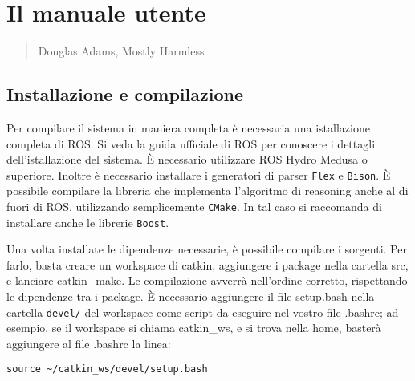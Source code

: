 \chapter{Il manuale utente}
\label{app:manuale}
\thispagestyle{empty}

\begin{quotation}
{\footnotesize
{}
\begin{flushright}
Douglas Adams, Mostly Harmless
\end{flushright}
}
\end{quotation}
\vspace{0.5cm}

\section{Installazione e compilazione}

Per compilare il sistema in maniera completa è necessaria una istallazione completa di ROS. Si veda la guida ufficiale di ROS per conoscere i dettagli dell'istallazione del sistema. \`E necessario utilizzare ROS Hydro Medusa o superiore.  %
Inoltre è necessario installare i generatori di parser \verb|Flex| e \verb|Bison|.
\`E possibile compilare la libreria che implementa l'algoritmo di reasoning anche al di fuori di ROS, utilizzando semplicemente \verb|CMake|. In tal caso si raccomanda di installare anche le librerie \verb|Boost|.

Una volta installate le dipendenze necessarie, è possibile compilare i sorgenti. Per farlo, basta creare un workspace di catkin, aggiungere i package nella cartella src, e lanciare catkin\_make. Le compilazione avverrà nell'ordine corretto, rispettando le dipendenze tra i package.
\`E necessario aggiungere il file setup.bash nella cartella \verb|devel/| del workspace come script da eseguire nel vostro file .bashrc; ad esempio, se il workspace  si chiama catkin\_ws, e si trova nella home, basterà aggiungere al file .bashrc la linea:
\begin{verbatim}
source ~/catkin_ws/devel/setup.bash
\end{verbatim}

